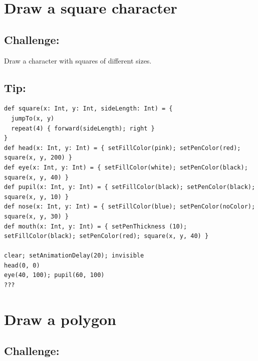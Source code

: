 \chapter{Draw a square character}\section*{\color{BrickRed}Challenge:}
Draw a character with squares of different sizes.
\\


  
\section*{\color{OliveGreen}Tip:}

\begin{lstlisting}[basicstyle={\ttfamily\fontsize{14}{17}\selectfont},numbers=none]
def square(x: Int, y: Int, sideLength: Int) = {
  jumpTo(x, y)
  repeat(4) { forward(sideLength); right }
}
def head(x: Int, y: Int) = { setFillColor(pink); setPenColor(red); square(x, y, 200) }
def eye(x: Int, y: Int) = { setFillColor(white); setPenColor(black); square(x, y, 40) }
def pupil(x: Int, y: Int) = { setFillColor(black); setPenColor(black); square(x, y, 10) }
def nose(x: Int, y: Int) = { setFillColor(blue); setPenColor(noColor); square(x, y, 30) }
def mouth(x: Int, y: Int) = { setPenThickness (10); setFillColor(black); setPenColor(red); square(x, y, 40) }

clear; setAnimationDelay(20); invisible
head(0, 0)
eye(40, 100); pupil(60, 100)
???
\end{lstlisting}
        
\chapter{Draw a polygon}\section*{\color{BrickRed}Challenge:}


